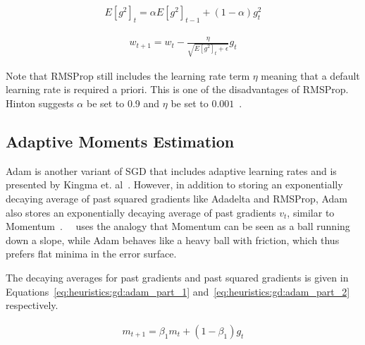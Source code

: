 \begin{equation}
      \label{eq:heuristics:gd:rmsprop_part_1}
      \begin{split}
            E[g^{2}]_{t} = \alpha E[g^{2}]_{t - 1} + (1 - \alpha)g_{t}^{2}
      \end{split}
\end{equation}

\begin{equation}
      \label{eq:heuristics:gd:rmsprop_part_2}
      \begin{split}
            w_{t+1} = w_{t} - \frac{\eta}{\sqrt{E[g^{2}]_{t} + \epsilon}} g_{t}
      \end{split}
\end{equation}

Note that \ac{RMSProp} still includes the learning rate term $\eta$ meaning that a default learning rate is required a priori. This is one of the disadvantages of \ac{RMSProp}. Hinton suggests $\alpha$ be set to 0.9 and $\eta$ be set to $0.001$~\cite{ref:hinton:2012}.


\subsection{Adaptive Moments Estimation}
\label{sec:heuristics:adam}

\Ac{Adam} is another variant of \ac{SGD} that includes adaptive learning rates and is presented by Kingma et. al~\cite{ref:kingma:2014}. However, in addition to storing an exponentially decaying average of past squared gradients like \ac{Adadelta} and \ac{RMSProp}, \ac{Adam} also stores an exponentially decaying average of past gradients $v_{t}$, similar to \ac{Momentum}~\cite{ref:ruder:2016}.~\citeauthor{ref:heusel:2017}~\cite{ref:heusel:2017} uses the analogy that \ac{Momentum} can be seen as a ball running down a slope, while \ac{Adam} behaves like a heavy ball with friction, which thus prefers flat minima in the error surface.

The decaying averages for past gradients and past squared gradients is given in Equations~\ref{eq:heuristics:gd:adam_part_1} and~\ref{eq:heuristics:gd:adam_part_2} respectively.

\begin{equation}
      \label{eq:heuristics:gd:adam_part_1}
      \begin{split}
            m_{t+1} = \beta_{1}m_{t} + (1 - \beta_{1})g_{t}
      \end{split}
\end{equation}


